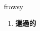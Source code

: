 
\begin{frame}
{\huge frowsy}
\begin{center}
\begin{enumerate}\Large
  \item \textbf{邋遢的}
\end{enumerate}
\end{center}
\end{frame}

